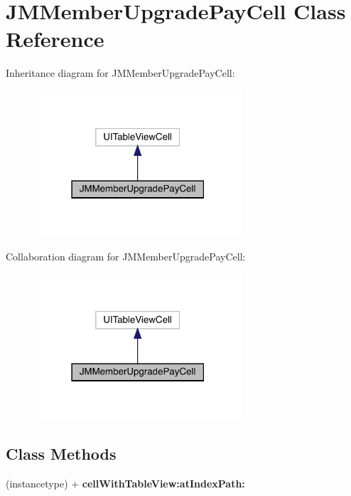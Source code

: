 \hypertarget{interface_j_m_member_upgrade_pay_cell}{}\section{J\+M\+Member\+Upgrade\+Pay\+Cell Class Reference}
\label{interface_j_m_member_upgrade_pay_cell}


Inheritance diagram for J\+M\+Member\+Upgrade\+Pay\+Cell\+:\nopagebreak
\begin{figure}[H]
\begin{center}
\leavevmode
\includegraphics[width=219pt]{interface_j_m_member_upgrade_pay_cell__inherit__graph}
\end{center}
\end{figure}


Collaboration diagram for J\+M\+Member\+Upgrade\+Pay\+Cell\+:\nopagebreak
\begin{figure}[H]
\begin{center}
\leavevmode
\includegraphics[width=219pt]{interface_j_m_member_upgrade_pay_cell__coll__graph}
\end{center}
\end{figure}
\subsection*{Class Methods}
\begin{DoxyCompactItemize}
\item 
\mbox{\label{interface_j_m_member_upgrade_pay_cell_a167827f7ebb34d8ab76025fe1a57bc56}} 
(instancetype) + {\bfseries cell\+With\+Table\+View\+:at\+Index\+Path\+:}
\end{DoxyCompactItemize}
